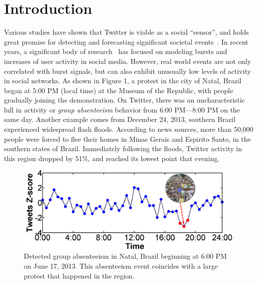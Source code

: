 \section{Introduction} \label{sec:intro}
Various studies have shown that Twitter is viable as a social ``sensor'', and holds great promise for detecting and forecasting significant societal events~\cite{bugel2013multilingual,sakaki2010earthquake}.
In recent years, a significant body of research~\cite{aggarwal2012event,hong2012discovering,lappas2009burstiness,lappas2012spatiotemporal,sakaki2010earthquake,sayyadi2009event,watanabe2011jasmine,weng2011event,yin2011geographical} has focused on modeling bursts and increases of user activity in social media. However, real world events are not only correlated with burst signals, but can also exhibit unusually low levels of activity in social networks.
As shown in Figure 1, a protest in the city of Natal, Brazil began at 5:00 PM (local time) at the Museum of the Republic, with people gradually joining the demonstration. %
On Twitter, there was an uncharacteristic lull in activity or {\it group absenteeism} behavior from 6:00 PM---8:00 PM on the same day.
Another example comes from December 24, 2013, southern Brazil experienced widespread flash floods. According to news sources, more than 50,000 people were forced to flee their homes in Minas Gerais and Espirito Santo, in the southern states of Brazil. Immediately following the floods, Twitter activity in this region dropped by 51\%, and reached its lowest point that evening.



\begin{figure}[t]
\centering
\includegraphics[width=4.5in]{figures/Natal_example1.png}
\caption{Detected group absenteeism in Natal, Brazil beginning at 6:00 PM on June 17, 2013. This absenteeism event coincides with a large protest that happened in the region.}
\label{fig:natal-protest}
\end{figure}


